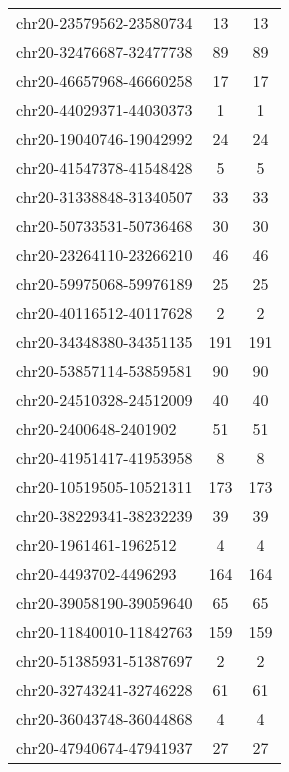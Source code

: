 \documentclass[10pt,letterpaper]{article}
\begin{document}
{\begin{longtable}{lSS}
	chr20-23579562-23580734 & 13     & 13                    \\
	chr20-32476687-32477738 & 89     & 89                    \\
	chr20-46657968-46660258 & 17     & 17                    \\
	chr20-44029371-44030373 & 1      & 1                     \\
	chr20-19040746-19042992 & 24     & 24                    \\
	chr20-41547378-41548428 & 5      & 5                     \\
	chr20-31338848-31340507 & 33     & 33                    \\
	chr20-50733531-50736468 & 30     & 30                    \\
	chr20-23264110-23266210 & 46     & 46                    \\
	chr20-59975068-59976189 & 25     & 25                    \\
	chr20-40116512-40117628 & 2      & 2                     \\
	chr20-34348380-34351135 & 191    & 191                   \\
	chr20-53857114-53859581 & 90     & 90                    \\
	chr20-24510328-24512009 & 40     & 40                    \\
	chr20-2400648-2401902   & 51     & 51                    \\
	chr20-41951417-41953958 & 8      & 8                     \\
	chr20-10519505-10521311 & 173    & 173                   \\
	chr20-38229341-38232239 & 39     & 39                    \\
	chr20-1961461-1962512   & 4      & 4                     \\
	chr20-4493702-4496293   & 164    & 164                   \\
	chr20-39058190-39059640 & 65     & 65                    \\
	chr20-11840010-11842763 & 159    & 159                   \\
	chr20-51385931-51387697 & 2      & 2                     \\
	chr20-32743241-32746228 & 61     & 61                    \\
	chr20-36043748-36044868 & 4      & 4                     \\
	chr20-47940674-47941937 & 27     & 27                    \\

\end{longtable}}
\end{document}
